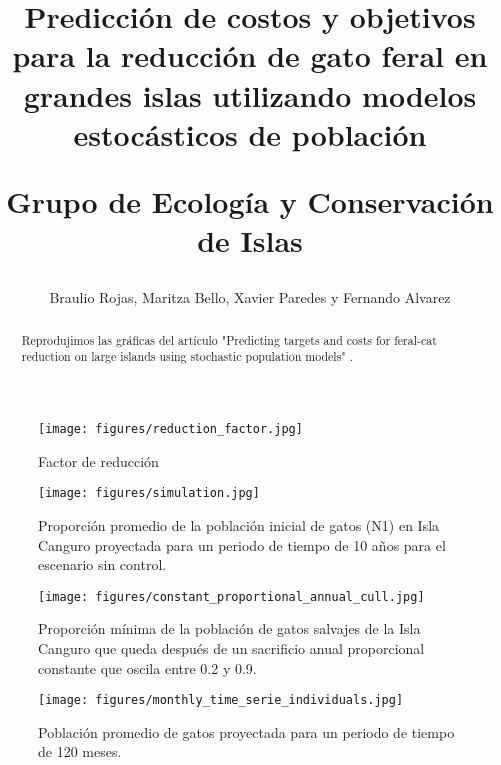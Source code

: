 \documentclass{article} %
\author{Braulio Rojas, Maritza Bello, Xavier Paredes y Fernando Alvarez}
\title{Predicción de costos y objetivos para la reducción de gato feral en grandes islas utilizando modelos estocásticos de población \\ \begin{large} Grupo de Ecología y Conservación de Islas \end{large}}
\begin{document}
\maketitle

\begin{abstract}

Reprodujimos las gráficas del artículo "Predicting targets and costs for feral-cat reduction on large islands using stochastic population models" \cite{venning2021predicting}.

\end{abstract}


\begin{figure}[H]
    \centering
\texttt{[image: figures/reduction\_factor.jpg]}
\caption{Factor de reducción}
\label{fig:reductionFactor}
\end{figure}

\begin{figure}[H]
    \centering
\texttt{[image: figures/simulation.jpg]}
\caption{Proporción promedio de la población inicial de gatos (N1) en Isla Canguro proyectada para un periodo de tiempo de 10 años para el escenario sin control.}
\label{fig:simulation}
\end{figure}

\begin{figure}[H]
    \centering
\texttt{[image: figures/constant\_proportional\_annual\_cull.jpg]}
\caption{Proporción mínima de la población de gatos salvajes de la Isla Canguro que queda después de un sacrificio anual proporcional constante que oscila entre 0.2 y 0.9.}
\label{fig:constantProportionalAnnualCull}
\end{figure}

\begin{figure}[H]
    \centering
\texttt{[image: figures/monthly\_time\_serie\_individuals.jpg]}
\caption{Población promedio de gatos proyectada para un periodo de tiempo de 120 meses.}
\label{fig:monthlyTimeSerieIndividuals}
\end{figure}



\end{document}
